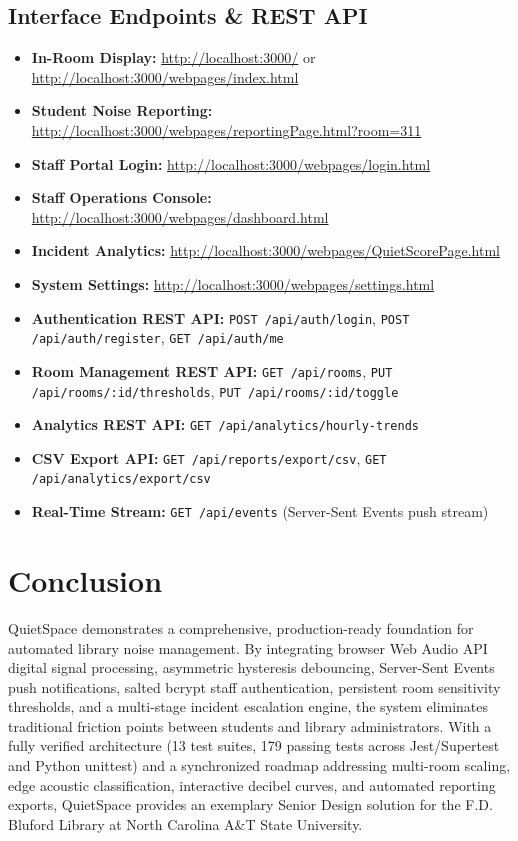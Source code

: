 \documentclass[11pt,a4paper]{article}
\begin{document}
\subsection{Interface Endpoints & REST API}
\begin{itemize}[leftmargin=*]
    \item \textbf{In-Room Display:} \url{http://localhost:3000/} or \url{http://localhost:3000/webpages/index.html}
    \item \textbf{Student Noise Reporting:} \url{http://localhost:3000/webpages/reportingPage.html?room=311}
    \item \textbf{Staff Portal Login:} \url{http://localhost:3000/webpages/login.html}
    \item \textbf{Staff Operations Console:} \url{http://localhost:3000/webpages/dashboard.html}
    \item \textbf{Incident Analytics:} \url{http://localhost:3000/webpages/QuietScorePage.html}
    \item \textbf{System Settings:} \url{http://localhost:3000/webpages/settings.html}
    \item \textbf{Authentication REST API:} \texttt{POST /api/auth/login}, \texttt{POST /api/auth/register}, \texttt{GET /api/auth/me}
    \item \textbf{Room Management REST API:} \texttt{GET /api/rooms}, \texttt{PUT /api/rooms/:id/thresholds}, \texttt{PUT /api/rooms/:id/toggle}
    \item \textbf{Analytics REST API:} \texttt{GET /api/analytics/hourly-trends}
    \item \textbf{CSV Export API:} \texttt{GET /api/reports/export/csv}, \texttt{GET /api/analytics/export/csv}
    \item \textbf{Real-Time Stream:} \texttt{GET /api/events} (Server-Sent Events push stream)
\end{itemize}

\section{Conclusion}
QuietSpace demonstrates a comprehensive, production-ready foundation for automated library noise management. By integrating browser Web Audio API digital signal processing, asymmetric hysteresis debouncing, Server-Sent Events push notifications, salted bcrypt staff authentication, persistent room sensitivity thresholds, and a multi-stage incident escalation engine, the system eliminates traditional friction points between students and library administrators. With a fully verified architecture (13 test suites, 179 passing tests across Jest/Supertest and Python unittest) and a synchronized roadmap addressing multi-room scaling, edge acoustic classification, interactive decibel curves, and automated reporting exports, QuietSpace provides an exemplary Senior Design solution for the F.D. Bluford Library at North Carolina A\&T State University.
\end{document}
